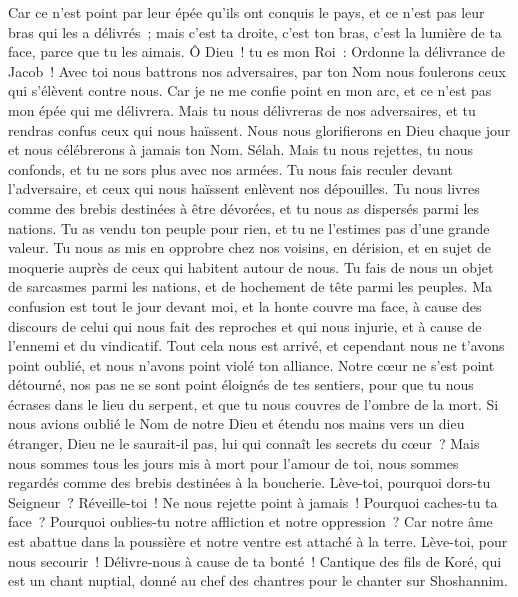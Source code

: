 \begin{multicols}{2}
Car ce n'est point par leur épée qu'ils ont conquis le pays, et ce n'est pas leur bras qui les a délivrés~; mais c'est ta droite, c'est ton bras, c'est la lumière de ta face, parce que tu les aimais.
Ô Dieu~! tu es mon Roi~: Ordonne la délivrance de Jacob~!
Avec toi nous battrons nos adversaires, par ton Nom nous foulerons ceux qui s'élèvent contre nous.
Car je ne me confie point en mon arc, et ce n'est pas mon épée qui me délivrera.
Mais tu nous délivreras de nos adversaires, et tu rendras confus ceux qui nous haïssent.
Nous nous glorifierons en Dieu chaque jour et nous célébrerons à jamais ton Nom. Sélah.
Mais tu nous rejettes, tu nous confonds, et tu ne sors plus avec nos armées.
Tu nous fais reculer devant l'adversaire, et ceux qui nous haïssent enlèvent nos dépouilles.
Tu nous livres comme des brebis destinées à être dévorées, et tu nous as dispersés parmi les nations.
Tu as vendu ton peuple pour rien, et tu ne l'estimes pas d'une grande valeur.
Tu nous as mis en opprobre chez nos voisins, en dérision, et en sujet de moquerie auprès de ceux qui habitent autour de nous.
Tu fais de nous un objet de sarcasmes parmi les nations, et de hochement de tête parmi les peuples.
Ma confusion est tout le jour devant moi, et la honte couvre ma face,
à cause des discours de celui qui nous fait des reproches et qui nous injurie, et à cause de l'ennemi et du vindicatif.
Tout cela nous est arrivé, et cependant nous ne t'avons point oublié, et nous n'avons point violé ton alliance.
Notre cœur ne s'est point détourné, nos pas ne se sont point éloignés de tes sentiers,
pour que tu nous écrases dans le lieu du serpent, et que tu nous couvres de l'ombre de la mort.
Si nous avions oublié le Nom de notre Dieu et étendu nos mains vers un dieu étranger,
Dieu ne le saurait-il pas, lui qui connaît les secrets du cœur~?
Mais nous sommes tous les jours mis à mort pour l'amour de toi, nous sommes regardés comme des brebis destinées à la boucherie.
Lève-toi, pourquoi dors-tu Seigneur~? Réveille-toi~! Ne nous rejette point à jamais~!
Pourquoi caches-tu ta face~? Pourquoi oublies-tu notre affliction et notre oppression~?
Car notre âme est abattue dans la poussière et notre ventre est attaché à la terre.
Lève-toi, pour nous secourir~! Délivre-nous à cause de ta bonté~!
\VerseOne{}Cantique des fils de Koré, qui est un chant nuptial, donné au chef des chantres pour le chanter sur Shoshannim.

\end{multicols}
